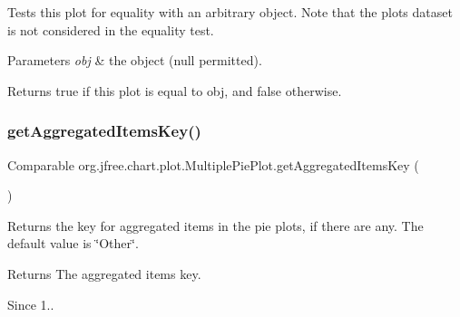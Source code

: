 Tests this plot for equality with an arbitrary object. Note that the plot\textquotesingle{}s dataset is not considered in the equality test.


\begin{DoxyParams}{Parameters}
{\em obj} & the object ({\ttfamily null} permitted).\\
\hline
\end{DoxyParams}
\begin{DoxyReturn}{Returns}
{\ttfamily true} if this plot is equal to {\ttfamily obj}, and {\ttfamily false} otherwise. 
\end{DoxyReturn}
\mbox{\label{classorg_1_1jfree_1_1chart_1_1plot_1_1_multiple_pie_plot_ac85a56c2f20afaef62000fdd1b4801d5}} 
\subsubsection{\texorpdfstring{get\+Aggregated\+Items\+Key()}{getAggregatedItemsKey()}}
{\footnotesize\ttfamily Comparable org.\+jfree.\+chart.\+plot.\+Multiple\+Pie\+Plot.\+get\+Aggregated\+Items\+Key (\begin{DoxyParamCaption}{ }\end{DoxyParamCaption})}

Returns the key for aggregated items in the pie plots, if there are any. The default value is \char`\"{}\+Other\char`\"{}.

\begin{DoxyReturn}{Returns}
The aggregated items key.
\end{DoxyReturn}
\begin{DoxySince}{Since}
1.. 
\end{DoxySince}
\mbox{\label{classorg_1_1jfree_1_1chart_1_1plot_1_1_multiple_pie_plot_acef21e3eb141c820d4739c807541326d}} 

